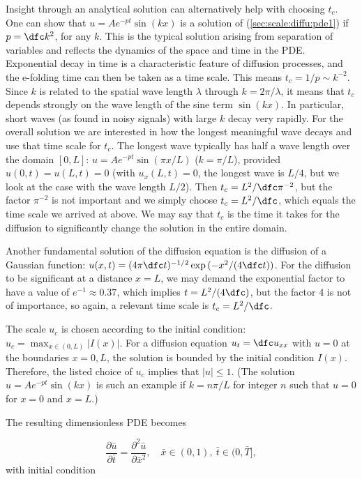\documentclass[graybox,envcountchap,sectrefs,final]{svmonodo}
\begin{document}
Insight through an analytical solution can alternatively
help with choosing $t_c$.
One can show that $u=Ae^{-pt}\sin (kx)$ is a solution of
(\ref{sec:scale:diffu:pde1}) if $p=\dfc k^2$, for any $k$.
This is the typical solution arising from separation of variables
and reflects the dynamics of the space and time in the PDE.
Exponential decay in
time is a characteristic feature of diffusion processes, and
the e-folding time can then be taken as a time scale. This means
$t_c = 1/p \sim k^{-2}$. Since $k$ is related to the spatial
wave length $\lambda$
through $k=2\pi/\lambda$, it means that $t_c$ depends strongly on the wave
length of the sine term $\sin(kx)$.
In particular, short waves (as found in noisy signals) with
large $k$ decay very rapidly.
For the overall solution we are interested in how the longest meaningful
wave decays and use that time scale for $t_c$. The longest wave
typically has half a wave length over the domain $[0,L]$:
$u = Ae^{-pt}\sin(\pi x/L)$ ($k=\pi/L$), provided $u(0,t)=u(L,t)=0$
(with $u_x(L,t)=0$, the longest wave is $L/4$, but we look at the
case with the wave length $L/2$). Then $t_c=L^2/\dfc \pi^{-2}$,
but the factor $\pi^{-2}$ is not important and we simply choose
$t_c=L^2/\dfc$, which equals the time scale we arrived at above.
We may say that $t_c$ is the time it takes for the diffusion to
significantly change the solution in the entire domain.

Another fundamental solution of the diffusion equation is the
diffusion of a Gaussian function: $u(x,t)=(4\pi\dfc
t)^{-1/2}\exp{(-x^2/(4\dfc t))}$. For the diffusion to be significant
at a distance $x=L$, we may demand the exponential factor to have a
value of $e^{-1}\approx 0.37$, which implies $t=L^2/(4\dfc)$, but the
factor 4 is not of importance, so again, a relevant time scale is
$t_c=L^2/\dfc$.

The scale $u_c$ is chosen according to the initial condition:
$u_c=\max_{x\in(0,L)}|I(x)|$. For a diffusion equation $u_t=\dfc u_{xx}$
with $u=0$ at the boundaries $x=0,L$, the solution is bounded by
the initial condition $I(x)$. Therefore, the listed choice of $u_c$
implies that
$|u|\leq 1$. (The solution $u=Ae^{-pt}\sin (kx)$ is such an example
if $k=n\pi/L$ for integer $n$ such that $u=0$ for $x=0$ and $x=L$.)

The resulting dimensionless PDE becomes

\begin{equation}
\frac{\partial \bar u}{\partial \bar t} =
\frac{\partial^2 \bar u}{\partial \bar x^2}, \quad  \bar x\in (0,1),\ \bar t\in (0,\bar T],
\label{sec:scale:diffu:pde1:d}
\end{equation}
with initial condition
\end{document}
